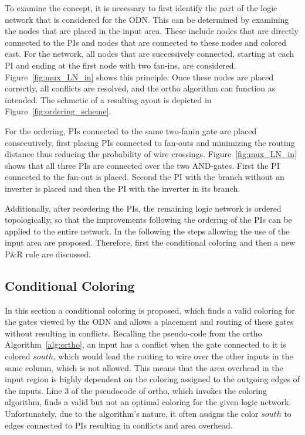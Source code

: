To examine the concept, it is necessary to first identify the part of the logic network that is considered for the ODN. This can be determined by examining the nodes that are placed in the input area. These include nodes that are directly connected to the PIs and nodes that are connected to these nodes and colored east. For the network, all nodes that are successively connected, starting at each PI and ending at the first node with two fan-ins, are considered. Figure~\ref{fig:mux_LN_in} shows this principle. Once these nodes are placed correctly, all conflicts are resolved, and the ortho algorithm can function as intended. The schmetic of a resulting ayout is depicted in Figure~\ref{fig:ordering_scheme}.

For the ordering, PIs connected to the same two-fanin gate are placed consecutively, first placing PIs connected to fan-outs and minimizing the routing distance thus reducing the probability of wire crossings. Figure~\ref{fig:mux_LN_in} shows that all three PIs are connected over the two AND-gates. First the PI connected to the fan-out is placed. Second the PI with the branch without an inverter is placed and then the PI with the inverter in its branch.

Additionally, after reordering the PIs, the remaining logic network is ordered topologically, so that the improvements following the ordering of the PIs can be applied to the entire network. In the following the steps allowing the use of the input area are proposed. Therefore, first the conditional coloring and then a new P\&R rule are discussed.

\subsection{Conditional Coloring}

In this section a conditional coloring is proposed, which finds a valid coloring for the gates viewed by the ODN and allows a placement and routing of these gates without resulting in conflicts. Recalling the pseudo-code from the ortho Algorithm~\ref{alg:ortho}, an input has a conflict when the gate connected to it is colored $south$, which would lead the routing to wire over the other inputs in the same column, which is not allowed. This means that the area overhead in the input region is highly dependent on the coloring assigned to the outgoing edges of the inputs. Line $3$ of the pseudocode of ortho, which invokes the coloring algorithm, finds a valid but not an optimal coloring for the given logic network. Unfortunately, due to the algorithm's nature, it often assigns the color $south$ to edges connected to PIs resulting in conflicts and area overhead.

